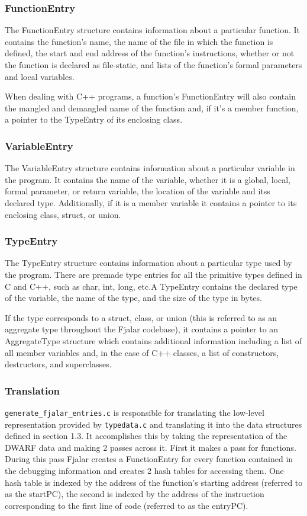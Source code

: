 \documentclass[11pt]{article}
\begin{document}
\subsubsection{FunctionEntry}
The FunctionEntry structure contains information about a particular
function. It contains the function's name, the name of the file in which  
the function is defined, the start and end address of the function's 
instructions, whether or not the function is declared as file-static,
and lists of the function's formal parameters and local variables. 

When dealing with C++ programs, a function's FunctionEntry will also  
contain the mangled and demangled name of the function and, if it's a
member function, a pointer to the TypeEntry of its enclosing class.

\subsubsection{VariableEntry}
The VariableEntry structure contains information about a particular
variable in the program. It contains the name of the variable, whether
it is a global, local, formal parameter, or return variable, the
location of the variable and itss declared type. Additionally,
if it is a member variable it contains a pointer to its enclosing
class, struct, or union.

\subsubsection{TypeEntry}
The TypeEntry structure contains information about a particular type used
by the program. There are premade type entries for all the primitive
types defined in C and C++, such as char, int, long, etc.A TypeEntry
contains  the
declared type of the variable, the name of the type, and the size of
the type in bytes.

If the type corresponds to a struct, class, or union (this is referred to
as an aggregate type throughout the Fjalar codebase), it contains a pointer
to an AggregateType structure which contains additional information
including a list of all member variables and, in the case of C++
classes, a list of constructors, destructors, and superclasses.

\subsubsection{Translation}
\texttt{generate\_fjalar\_entries.c} is responsible for translating
the low-level representation provided by \texttt{typedata.c} and
translating it into the data structures defined in section 1.3. It
accomplishes this by taking the representation of the DWARF data and
making 2 passes across it. First it makes a pass for functions. During
this pass Fjalar creates a FunctionEntry for every function contained
in the debugging information and creates 2 hash tables for accessing
them. One hash table is indexed by the address of the function's
starting address (referred to as the startPC), the second is indexed
by the address of the instruction corresponding to the first line of
code (referred to as the entryPC).
\end{document}
